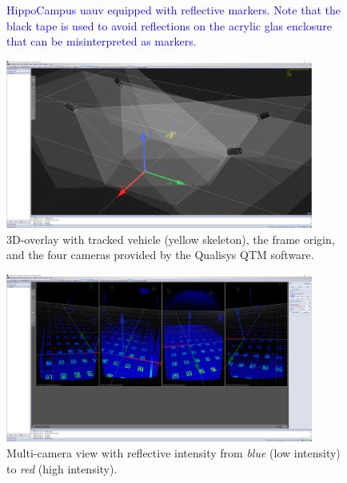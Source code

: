 \begin{figure}
    \centering
    
    \caption{\textcolor{blue}{HippoCampus \ac{uauv} equipped with reflective markers. Note that the black tape is used to avoid reflections on the acrylic glas enclosure that can be misinterpreted as markers.}}
    \label{fig:hippo_with_marker}
\end{figure}


\begin{figure}
    \centering
    \includegraphics[width=0.9\textwidth]{images/04/qtm_3d_overlay.png}
    \caption{3D-overlay with tracked vehicle (yellow skeleton), the frame origin, and the four cameras provided by the Qualisys QTM software.}
    \label{fig:qtm_3d}
\end{figure}

\begin{figure}
    \centering
    \includegraphics[width=0.9\textwidth]{images/04/qtm_multi_cam_intensity.png}
    \caption{Multi-camera view with reflective intensity from \textit{blue} (low intensity) to \textit{red} (high intensity).}
    \label{fig:qtm_intensity}
\end{figure}


